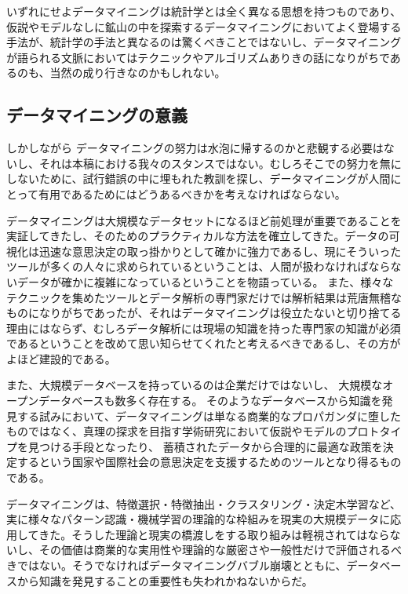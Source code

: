 いずれにせよデータマイニングは統計学とは全く異なる思想を持つものであり、仮説やモデルなしに鉱山の中を探索するデータマイニングにおいてよく登場する手法が、統計学の手法と異なるのは驚くべきことではないし、データマイニングが語られる文脈においてはテクニックやアルゴリズムありきの話になりがちであるのも、当然の成り行きなのかもしれない。

\subsection{データマイニングの意義}
しかしながら
データマイニングの努力は水泡に帰するのかと悲観する必要はないし、それは本稿における我々のスタンスではない。むしろそこでの努力を無にしないために、試行錯誤の中に埋もれた教訓を探し、データマイニングが人間にとって有用であるためにはどうあるべきかを考えなければならない。

データマイニングは大規模なデータセットになるほど前処理が重要であることを実証してきたし、そのためのプラクティカルな方法を確立してきた。データの可視化は迅速な意思決定の取っ掛かりとして確かに強力であるし、現にそういったツールが多くの人々に求められているということは、人間が扱わなければならないデータが確かに複雑になっているということを物語っている。
また、様々なテクニックを集めたツールとデータ解析の専門家だけでは解析結果は荒唐無稽なものになりがちであったが、それはデータマイニングは役立たないと切り捨てる理由にはならず、むしろデータ解析には現場の知識を持った専門家の知識が必須であるということを改めて思い知らせてくれたと考えるべきであるし、その方がよほど建設的である。

また、大規模データベースを持っているのは企業だけではないし、
大規模なオープンデータベースも数多く存在する。
そのようなデータベースから知識を発見する試みにおいて、データマイニングは単なる商業的なプロパガンダに堕したものではなく、真理の探求を目指す学術研究において仮説やモデルのプロトタイプを見つける手段となったり、
蓄積されたデータから合理的に最適な政策を決定するという国家や国際社会の意思決定を支援するためのツールとなり得るものである。

データマイニングは、特徴選択・特徴抽出・クラスタリング・決定木学習など、実に様々なパターン認識・機械学習の理論的な枠組みを現実の大規模データに応用してきた。そうした理論と現実の橋渡しをする取り組みは軽視されてはならないし、その価値は商業的な実用性や理論的な厳密さや一般性だけで評価されるべきではない。そうでなければデータマイニングバブル崩壊とともに、データベースから知識を発見することの重要性も失われかねないからだ。

